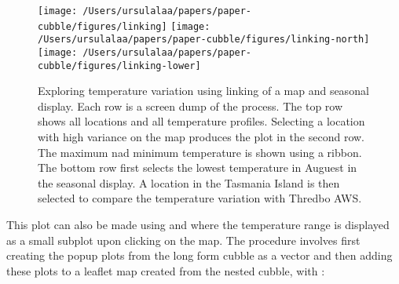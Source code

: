 \documentclass{article}
\newenvironment{Shaded}{\begin{snugshade}}{\end{snugshade}}
\newcommand{\AttributeTok}[1]{\textcolor[rgb]{0.77,0.63,0.00}{#1}}
\newcommand{\CommentTok}[1]{\textcolor[rgb]{0.56,0.35,0.01}{\textit{#1}}}
\newcommand{\ControlFlowTok}[1]{\textcolor[rgb]{0.13,0.29,0.53}{\textbf{#1}}}
\newcommand{\DecValTok}[1]{\textcolor[rgb]{0.00,0.00,0.81}{#1}}
\newcommand{\ErrorTok}[1]{\textcolor[rgb]{0.64,0.00,0.00}{\textbf{#1}}}
\newcommand{\FunctionTok}[1]{\textcolor[rgb]{0.00,0.00,0.00}{#1}}
\newcommand{\NormalTok}[1]{#1}
\newcommand{\OtherTok}[1]{\textcolor[rgb]{0.56,0.35,0.01}{#1}}
\newcommand{\SpecialCharTok}[1]{\textcolor[rgb]{0.00,0.00,0.00}{#1}}
\newcommand{\StringTok}[1]{\textcolor[rgb]{0.31,0.60,0.02}{#1}}
\begin{document}
\begin{figure}
\texttt{[image: /Users/ursulalaa/papers/paper-cubble/figures/linking]} \texttt{[image: /Users/ursulalaa/papers/paper-cubble/figures/linking-north]} \texttt{[image: /Users/ursulalaa/papers/paper-cubble/figures/linking-lower]} \caption{Exploring temperature variation using linking of a map and seasonal display. Each row is a screen dump of the process. The top row shows all locations and all temperature profiles. Selecting a location with high variance on the map produces the plot in the second row. The maximum nad minimum temperature is shown using a ribbon. The bottom row first selects the lowest temperature in Auguest in the seasonal display. A location in the Tasmania Island is then selected to compare the temperature variation with Thredbo AWS.}\label{fig:interactive-linking}
\end{figure}

This plot can also be made using  and  where the temperature range is displayed as a small subplot upon clicking on the map. The procedure involves first creating the popup plots from the long form cubble as a vector and then adding these plots to a leaflet map created from the nested cubble, with :

\begin{Shaded}
\end{Shaded}
\end{document}
